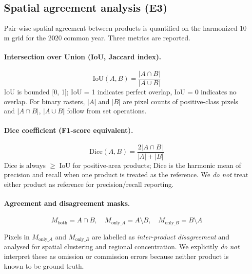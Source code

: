 \documentclass[11pt]{article}
\begin{document}
\subsection{Spatial agreement analysis (E3)}

Pair-wise spatial agreement between products is quantified on the harmonized
10\,m grid for the 2020 common year. Three metrics are reported.

\paragraph{Intersection over Union (IoU, Jaccard index).}
\begin{equation}
\text{IoU}(A, B) = \frac{|A \cap B|}{|A \cup B|}
\label{eq:iou}
\end{equation}
IoU is bounded [0, 1]; IoU = 1 indicates perfect overlap, IoU = 0 indicates no
overlap. For binary rasters, $|A|$ and $|B|$ are pixel counts of positive-class
pixels and $|A \cap B|$, $|A \cup B|$ follow from set operations.

\paragraph{Dice coefficient (F1-score equivalent).}
\begin{equation}
\text{Dice}(A, B) = \frac{2|A \cap B|}{|A| + |B|}
\label{eq:dice}
\end{equation}
Dice is always $\geq$ IoU for positive-area products; Dice is the harmonic mean
of precision and recall when one product is treated as the reference. We \emph{do
not} treat either product as reference for precision/recall reporting.

\paragraph{Agreement and disagreement masks.}
\begin{equation}
M_{\text{both}} = A \cap B, \quad
M_{\text{only}\_A} = A \setminus B, \quad
M_{\text{only}\_B} = B \setminus A
\label{eq:masks}
\end{equation}

Pixels in $M_{\text{only}\_A}$ and $M_{\text{only}\_B}$ are labelled as
\emph{inter-product disagreement} and analysed for spatial clustering and
regional concentration. We explicitly \emph{do not} interpret these as omission
or commission errors because neither product is known to be ground truth.
\end{document}
